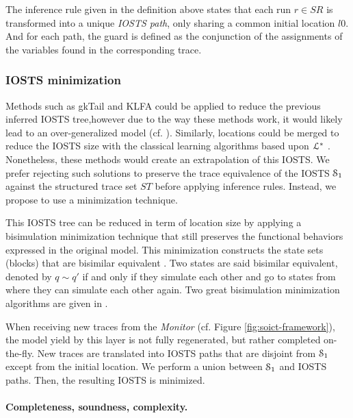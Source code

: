 The inference rule given in the definition above states that each
run $r \in SR$ is transformed into a unique \emph{IOSTS path},
only sharing a common initial location $l0$. And for each path,
the guard is defined as the conjunction of the assignments of the
variables found in the corresponding trace.

\subsubsection{IOSTS minimization}

Methods such as gkTail and KLFA could be applied to reduce the
previous inferred IOSTS tree,however due to the way these
methods work, it would likely lead to an over-generalized model
(cf. ).
Similarly, locations could be merged to reduce the IOSTS size
with the classical learning algorithms based upon
$\EuScript{L}^*$ \cite{Angluin198787,lambeau08}. Nonetheless,
these methods would create an extrapolation of this IOSTS. We
prefer rejecting such solutions to preserve the trace equivalence
\cite{petrenko06} of the IOSTS $\EuScript{S}_1$ against the
structured trace set $ST$ before applying inference rules.
Instead, we propose to use a minimization technique.

This IOSTS tree can be reduced in term of location size by
applying a bisimulation minimization technique that still
preserves the functional behaviors expressed in the original
model. This minimization constructs the state sets (blocks) that
are bisimilar equivalent \cite{Park:1981:CAI:647210.720030}. Two
states are said bisimilar equivalent, denoted by $q \sim q'$ if
and only if they simulate each other and go to states from where
they can simulate each other again.  Two great bisimulation
minimization algorithms are given in
\cite{Fernandez89animplementation,Abdulla06}.

When receiving new traces from the \emph{Monitor} (cf. Figure
\ref{fig:soict-framework}), the model yield by this layer is not
fully regenerated, but rather completed on-the-fly. New traces
are translated into IOSTS paths that are disjoint from
$\EuScript{S}_1$ except from the initial location. We perform a
union between $\EuScript{S}_1$ and IOSTS paths. Then, the
resulting IOSTS is minimized.

\paragraph{Completeness, soundness, complexity.}

